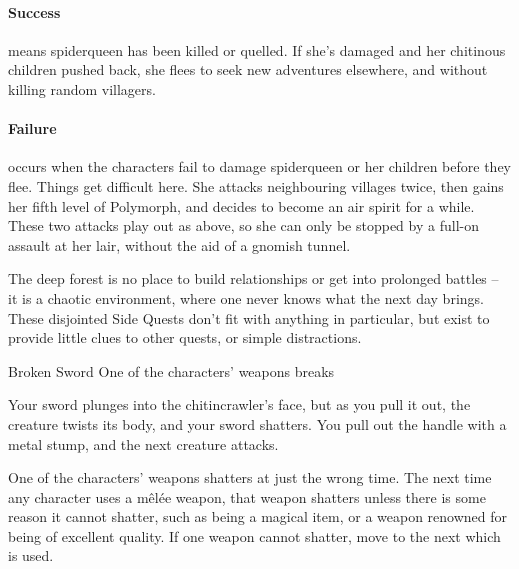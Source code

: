 \begin{multicols}{2}

\paragraph{Success} means \gls{spiderqueen} has been killed or quelled.
If she's damaged and her chitinous children pushed back, she flees to seek new adventures elsewhere, and without killing random villagers.

\paragraph{Failure} occurs when the characters fail to damage \gls{spiderqueen} or her children before they flee.
Things get difficult here.
She attacks neighbouring villages twice, then gains her fifth level of Polymorph, and decides to become an air spirit for a while.
These two attacks play out as above, so she can only be stopped by a full-on assault at her lair, without the aid of a gnomish tunnel.

\stopcontents[sq]

\label{interruptions}

\startcontents[sq]

\sqminitoc

\noindent
The deep forest is no place to build relationships or get into prolonged battles -- it is a chaotic environment, where one never knows what the next day brings.
These disjointed Side Quests don't fit with anything in particular, but exist to provide little clues to other quests, or simple distractions.

{\squash Broken Sword}%
{One of the characters' weapons breaks}%

\begin{boxtext}

  Your sword plunges into the chitincrawler's face, but as you pull it out, the creature twists its body, and your sword shatters.
  You pull out the handle with a metal stump, and the next creature attacks.

\end{boxtext}

One of the characters' weapons shatters at just the wrong time.
The next time any character uses a m\^el\'ee weapon, that weapon shatters unless there is some reason it cannot shatter, such as being a magical item, or a weapon renowned for being of excellent quality.
If one weapon cannot shatter, move to the next which is used.


\end{multicols}
